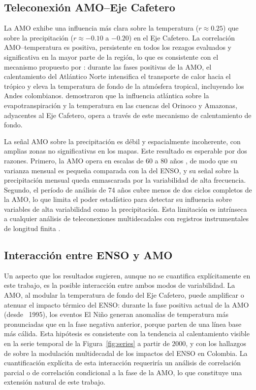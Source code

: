 \documentclass[12pt, a4paper]{article}
\begin{document}
\subsection{Teleconexión AMO--Eje Cafetero}

La AMO exhibe una influencia más clara sobre la temperatura ($r \approx 0.25$)
que sobre la precipitación ($r \approx -0.10$ a $-0.20$) en el Eje Cafetero.
La correlación AMO--temperatura es positiva, persistente en todos los rezagos
evaluados y significativa en la mayor parte de la región, lo que es consistente
con el mecanismo propuesto por \citet{Knight2006}: durante las fases positivas
de la AMO, el calentamiento del Atlántico Norte intensifica el transporte de
calor hacia el trópico y eleva la temperatura de fondo de la atmósfera tropical,
incluyendo los Andes colombianos. \citet{DuqueGardeazabal2025} demostraron
que la influencia atlántica sobre la evapotranspiración y la temperatura en
las cuencas del Orinoco y Amazonas, adyacentes al Eje Cafetero, opera a través
de este mecanismo de calentamiento de fondo.

La señal AMO sobre la precipitación es débil y espacialmente incoherente, con
amplias zonas no significativas en los mapas. Este resultado es esperable por
dos razones. Primero, la AMO opera en escalas de 60 a 80 años \citep{Enfield2001},
de modo que su varianza mensual es pequeña comparada con la del ENSO, y su
señal sobre la precipitación mensual queda enmascarada por la variabilidad de
alta frecuencia. Segundo, el período de análisis de 74 años cubre menos de dos
ciclos completos de la AMO, lo que limita el poder estadístico para detectar su
influencia sobre variables de alta variabilidad como la precipitación. Esta
limitación es intrínseca a cualquier análisis de teleconexiones multidecadales
con registros instrumentales de longitud finita \citep{Canchala2020}.

\subsection{Interacción entre ENSO y AMO}

Un aspecto que los resultados sugieren, aunque no se cuantifica explícitamente
en este trabajo, es la posible interacción entre ambos modos de variabilidad.
La AMO, al modular la temperatura de fondo del Eje Cafetero, puede amplificar
o atenuar el impacto térmico del ENSO: durante la fase positiva actual de la
AMO (desde ~1995), los eventos El Niño generan anomalías de temperatura más
pronunciadas que en la fase negativa anterior, porque parten de una línea base
más cálida. Esta hipótesis es consistente con la tendencia al calentamiento
visible en la serie temporal de la Figura~\ref{fig:series} a partir de 2000,
y con los hallazgos de \citet{Poveda2011} sobre la modulación multidecadal
de los impactos del ENSO en Colombia. La cuantificación explícita de esta
interacción requeriría un análisis de correlación parcial o de correlación
condicional a la fase de la AMO, lo que constituye una extensión natural de
este trabajo.
\end{document}
